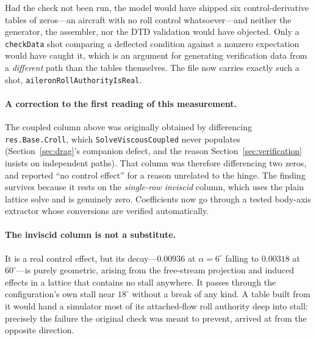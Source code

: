 \documentclass[11pt,a4paper]{article}
\newcommand{\varid}[1]{\texttt{\small #1}}
\newcommand{\dg}{^\circ}
\begin{document}
Had the check not been run, the model would have shipped six
control-derivative tables of zeros---an aircraft with no roll control
whatsoever---and neither the generator, the assembler, nor the
DTD validation would have objected. Only a \texttt{checkData} shot
comparing a deflected condition against a nonzero expectation would have
caught it, which is an argument for generating verification data from a
\emph{different} path than the tables themselves. The file now carries
exactly such a shot, \varid{aileronRollAuthorityIsReal}.

\paragraph{A correction to the first reading of this measurement.} The
coupled column above was originally obtained by differencing
\texttt{res.Base.Croll}, which \texttt{SolveViscousCoupled} never
populates (Section~\ref{sec:drag}'s companion defect, and the reason
Section~\ref{sec:verification} insists on independent paths). That
column was therefore differencing two zeros, and reported ``no control
effect'' for a reason unrelated to the hinge. The finding survives
because it rests on the \emph{single-row inviscid} column, which uses
the plain lattice solve and is genuinely zero. Coefficients now go
through a tested body-axis extractor whose conversions are verified automatically.

\paragraph{The inviscid column is not a substitute.} It is a real control
effect, but its decay---$0.00936$ at $\alpha = 6\dg$ falling to
$0.00318$ at $60\dg$---is purely geometric, arising from the free-stream
projection and induced effects in a lattice that contains no stall
anywhere. It passes through the configuration's own stall near $18\dg$
without a break of any kind. A table built from it would hand a
simulator most of its attached-flow roll authority deep into stall:
precisely the failure the original check was meant to prevent, arrived at
from the opposite direction.
\end{document}
